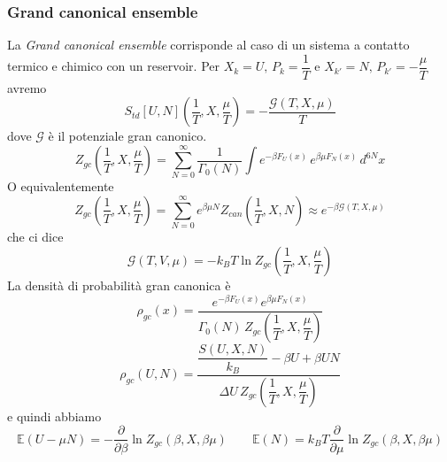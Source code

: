 \documentclass[11pt,a4paper,twoside]{book}
\numberwithin{equation}{section} %
\begin{document}
\subsubsection{Grand canonical ensemble}
La \textit{Grand canonical ensemble} corrisponde al caso di un sistema a contatto termico e chimico con un reservoir.
Per $X_k=U,\, P_k=\dfrac{1}{T}$ e $X_{k'}=N,\, P_{k'}=-\dfrac{\mu}{T}$ avremo
\[
S_{td}[U,N]\left(\dfrac{1}{T},X,\dfrac{\mu}{T}\right)=-\dfrac{\mathcal{G}(T,X,\mu)}{T}
\]
dove $\mathcal{G}$ è il potenziale gran canonico.
\[
Z_{gc}\left(\dfrac{1}{T},X,\dfrac{\mu}{T}\right)=\sum_{N=0}^{\infty}\dfrac{1}{\Gamma_0(N)}\int e^{-\beta F_U(x)}\,e^{\beta\mu F_N(x)}\,d^{6N}x
\]
O equivalentemente
\[
Z_{gc}\left(\dfrac{1}{T},X,\dfrac{\mu}{T}\right)=\sum_{N=0}^\infty e^{\beta\mu N}Z_{can}(\dfrac{1}{T},X,N)\approx e^{-\beta\mathcal{G}(T,X,\mu)}
\]
che ci dice
\begin{equation}
\mathcal{G}(T,V,\mu)=-k_BT\ln Z_{gc}\left(\dfrac{1}{T},X,\dfrac{\mu}{T}\right)
\end{equation}
La densità di probabilità gran canonica è
\begin{equation}
\rho_{gc}(x)=\dfrac{ e^{-\beta F_U(x)} e^{\beta\mu F_N(x)} }{\Gamma_0(N)\,Z_{gc}\left( \dfrac{1}{T},X,\dfrac{\mu}{T} \right) }
\end{equation}
\[
\rho_{gc}(U,N)=\dfrac{ \dfrac{S(U,X,N)}{k_B}-\beta U+\beta U N }{\Delta U\,Z_{gc}\left( \dfrac{1}{T},X,\dfrac{\mu}{T} \right) }
\]
e quindi abbiamo
\[
\mathbb{E}(U-\mu N)=-\dfrac{\partial}{\partial \beta}\ln Z_{gc}(\beta,X,\beta\mu) \qquad
\mathbb{E}(N)=k_BT\dfrac{\partial}{\partial\mu}\ln Z_{gc}(\beta,X,\beta\mu)
\]



\end{document}
